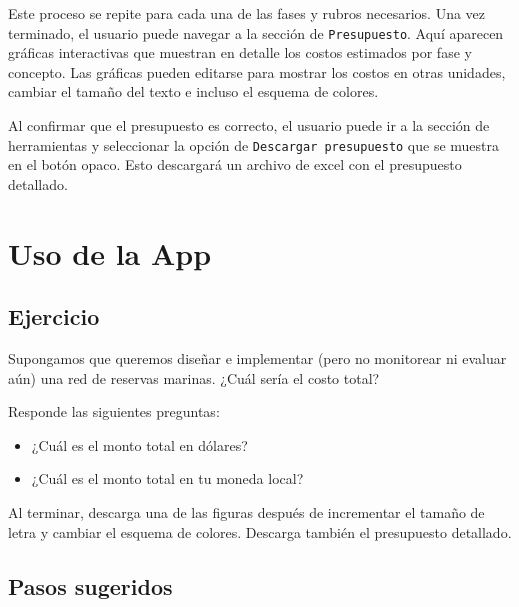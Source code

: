 \documentclass[]{krantz}
\providecommand{\tightlist}{%
  \setlength{\itemsep}{0pt}\setlength{\parskip}{0pt}}
\begin{document}
Este proceso se repite para cada una de las fases y rubros necesarios.
Una vez terminado, el usuario puede navegar a la sección de
\texttt{Presupuesto}. Aquí aparecen gráficas interactivas que muestran
en detalle los costos estimados por fase y concepto. Las gráficas pueden
editarse para mostrar los costos en otras unidades, cambiar el tamaño
del texto e incluso el esquema de colores.

Al confirmar que el presupuesto es correcto, el usuario puede ir a la
sección de herramientas y seleccionar la opción de
\texttt{Descargar\ presupuesto} que se muestra en el botón opaco. Esto
descargará un archivo de excel con el presupuesto detallado.

\hypertarget{uso-de-la-app}{%
\section{Uso de la App}\label{uso-de-la-app}}

\hypertarget{ejercicio}{%
\subsection{Ejercicio}\label{ejercicio}}

Supongamos que queremos diseñar e implementar (pero no monitorear ni
evaluar aún) una red de reservas marinas. ¿Cuál sería el costo total?

Responde las siguientes preguntas:

\begin{itemize}
\tightlist
\item
  ¿Cuál es el monto total en dólares?
\item
  ¿Cuál es el monto total en tu moneda local?
\end{itemize}

Al terminar, descarga una de las figuras después de incrementar el
tamaño de letra y cambiar el esquema de colores. Descarga también el
presupuesto detallado.

\hypertarget{pasos-sugeridos}{%
\subsection{Pasos sugeridos}\label{pasos-sugeridos}}
\end{document}
